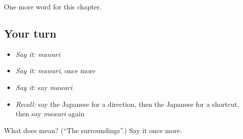 \begin{grammarlens}[title={What you've built}]
One more word for this chapter.
\end{grammarlens}

\subsection*{Your turn}
\begin{itemize}
\raggedright
  \item \emph{Say it:} \emph{mawari}
  \item \emph{Say it:} \emph{mawari}, once more
  \item \emph{Say it:} say \emph{mawari}
  \item \emph{Recall:} say the Japanese for a direction, then the Japanese for a shortcut, then say \emph{mawari} again
\end{itemize}

\begin{tcolorbox}[breakable,colback=teal!4,colframe=teal!35!black,title={Before you move on}]
What does  mean? (\textquotedblleft{}The surroundings\textquotedblright{}.) Say it once more.
\end{tcolorbox}
